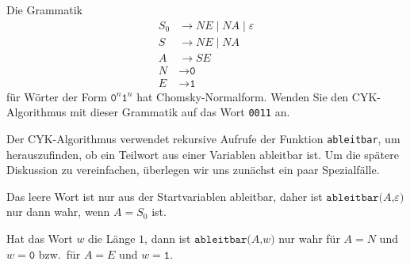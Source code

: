 Die Grammatik
\begin{align*}
S_0& \to NE \mid NA \mid \varepsilon \\
S  & \to NE \mid NA \\
A  &\to SE \\
N&\to \texttt{0} \\
E&\to \texttt{1} 
\end{align*}
für Wörter der Form
$\texttt{0}^n\texttt{1}^n$
hat Chomsky-Normalform.
Wenden Sie den CYK-Algorithmus mit dieser Grammatik auf das Wort
\texttt{0011} an.

\def\ableitbar#1#2{
	\texttt{ableitbar(}#1\texttt{,}#2\texttt{)}
}

\begin{loesung}
Der CYK-Algorithmus verwendet rekursive Aufrufe der Funktion
\texttt{ableitbar}, um herauszufinden, ob ein Teilwort aus einer 
Variablen ableitbar ist.
Um die spätere Diskussion zu vereinfachen, überlegen wir uns zunächst
ein paar Spezialfälle.

Das leere Wort ist nur aus der Startvariablen ableitbar, daher ist
$\ableitbar{A}{\varepsilon}$ nur dann wahr, wenn $A=S_0$ ist.

Hat das Wort $w$ die Länge $1$, dann ist 
$\ableitbar{A}{w}$ nur wahr
für $A=N$ und $w=\texttt{0}$
bzw.~für $A=E$ und $w=\texttt{1}$.


\end{loesung}
